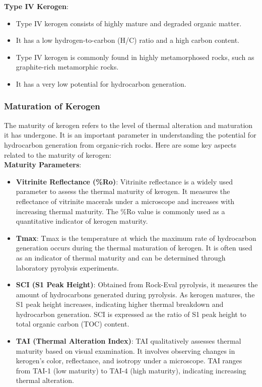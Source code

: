 \documentclass{article}
\begin{document}
\textbf{Type IV Kerogen}:
    \begin{itemize}
        \item Type IV kerogen consists of highly mature and degraded organic matter.
        \item It has a low hydrogen-to-carbon (H/C) ratio and a high carbon content.
        \item Type IV kerogen is commonly found in highly metamorphosed rocks, such as graphite-rich metamorphic rocks.
        \item It has a very low potential for hydrocarbon generation.
    \end{itemize}

\subsubsection*{Maturation of Kerogen}
The maturity of kerogen refers to the level of thermal alteration and maturation it has undergone. It is an important parameter in understanding the potential for hydrocarbon generation from organic-rich rocks. Here are some key aspects related to the maturity of kerogen:\\

\textbf{Maturity Parameters}:
    \begin{itemize}
        \item \textbf{Vitrinite Reflectance (\%Ro)}: Vitrinite reflectance is a widely used parameter to assess the thermal maturity of kerogen. It measures the reflectance of vitrinite macerals under a microscope and increases with increasing thermal maturity. The \%Ro value is commonly used as a quantitative indicator of kerogen maturity.
        \item \textbf{Tmax}: Tmax is the temperature at which the maximum rate of hydrocarbon generation occurs during the thermal maturation of kerogen. It is often used as an indicator of thermal maturity and can be determined through laboratory pyrolysis experiments.
        \item \textbf{SCI (S1 Peak Height)}: Obtained from Rock-Eval pyrolysis, it measures the amount of hydrocarbons generated during pyrolysis. As kerogen matures, the S1 peak height increases, indicating higher thermal breakdown and hydrocarbon generation. SCI is expressed as the ratio of S1 peak height to total organic carbon (TOC) content.
        \item \textbf{TAI (Thermal Alteration Index)}: TAI qualitatively assesses thermal maturity based on visual examination. It involves observing changes in kerogen's color, reflectance, and isotropy under a microscope. TAI ranges from TAI-1 (low maturity) to TAI-4 (high maturity), indicating increasing thermal alteration.
    \end{itemize}
\end{document}

